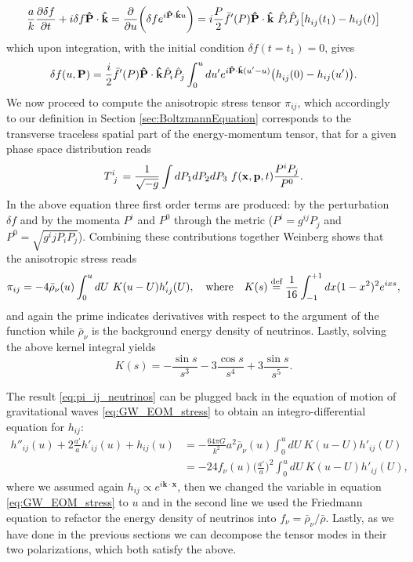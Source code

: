 $$\frac{a}{k}\frac{\partial \delta f}{\partial t}+i\delta f \mathbf{\hat P\cdot\hat k}=\frac{\partial}{\partial u}\bigg(\delta f e^{i\mathbf{\hat P\cdot\hat k}u}\bigg)=i\frac{P}{2}\bar f'(P)\mathbf{\hat P\cdot\hat k}\ \hat P_i\hat P_j\big[\tensor{h}{_i_j}(t_1)-h_{ij}( t)\big]$$
which upon integration, with the initial condition $\delta f(t=t_1)=0$, gives
\begin{equation}
    \delta f(u,\mathbf P) = \frac{i}{2}\bar f'(P)\mathbf{\hat P\cdot\hat k}\hat P_i\hat P_j\int_{0}^{u}du'e^{i\mathbf{\hat P\cdot\hat k}(u'-u)}\big(\tensor{h}{_i_j}(0)-h_{ij}(u')\big).
\end{equation}
We now proceed to compute the anisotropic stress tensor $\pi_{ij}$, which accordingly to our definition in Section \ref{sec:BoltzmannEquation} corresponds to the transverse traceless spatial part of the energy-momentum tensor, that for a given phase space distribution reads
\begin{align*}
    \tensor{T}{^i_j}=\frac{1}{\sqrt{- g}}\int dP_1dP_2dP_3\ f(\mathbf x,\mathbf p,t)\frac{P^iP_j}{P^0}.
\end{align*}
In the above equation three first order terms are produced: by the perturbation $\delta f$ and by the momenta $P^i$ and $P^0$ through the metric ($P^i=g^{ij}P_j$ and $P^0=\sqrt{g^ijP_iP_j}$). Combining these contributions together Weinberg \cite{Weinberg_nu_dump} shows that the anisotropic stress reads
\begin{equation}
    \pi_{ij}=-4\bar\rho_\nu(u)\int_0^u dU\ K(u-U)h'_{ij}(U),\quad \text{where}\quad K(s)\stackrel{\text{def}}{=}\frac{1}{16}\int_{-1}^{+1}dx(1-x^2)^2e^{ixs},\label{eq:pi_ij_neutrinos}
\end{equation}
and again the prime indicates derivatives with respect to the argument of the function while $\bar\rho_\nu$ is the background energy density of neutrinos. Lastly, solving the above kernel integral yields
\begin{equation*}
    K(s)=-\frac{\sin s}{s^3}-3\frac{\cos s}{s^4}+3\frac{\sin s}{s^5}.
\end{equation*}

The result \eqref{eq:pi_ij_neutrinos} can be plugged back in the equation of motion of gravitational waves \eqref{eq:GW_EOM_stress} to obtain an integro-differential equation for $h_{ij}$: 
\begin{align}
    h''_{ij}(u)+2\frac{a'}{a}h'_{ij}(u)+ h_{ij}(u)&=-\frac{64\pi G}{k^2} a^2\bar\rho_\nu(u)\int_0^u dU\ K(u-U)h'_{ij}(U)\nonumber\\
    &=-24f_\nu(u)\bigg(\frac{a'}{a}\bigg)^2\int_0^u dU\ K(u-U)h'_{ij}(U),\label{eq:GW_EOM_neutrinos}
\end{align}
where we assumed again $h_{ij}\propto e^{i\mathbf{k\cdot x}}$, then we changed the variable in equation \eqref{eq:GW_EOM_stress} to $u$ and in the second line we used the Friedmann equation to refactor the energy density of neutrinos into $f_\nu= \bar\rho_\nu/\bar\rho$. Lastly, as we have done in the previous sections we can decompose the tensor modes in their two polarizations, which both satisfy the above. 

